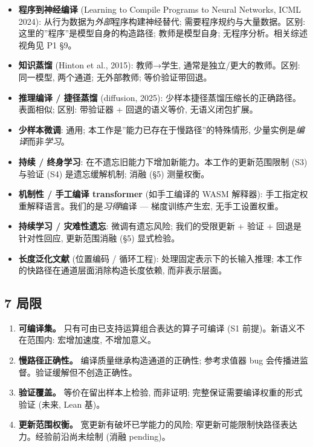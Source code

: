 \documentclass[
]{article}
\providecommand{\tightlist}{%
  \setlength{\itemsep}{0pt}\setlength{\parskip}{0pt}}
\begin{document}
\begin{itemize}
\tightlist
\item
  \textbf{程序到神经编译} (Learning to Compile Programs to Neural
  Networks, ICML 2024): 从行为数据为\emph{外部}程序构建神经替代;
  需要程序规约与大量数据。区别: 这里的''程序''是模型自身的构造路径;
  教师是模型自身; 无程序分析。相关综述视角见 P1 §9。
\item
  \textbf{知识蒸馏} (Hinton et al., 2015): 教师→学生,
  通常是独立/更大的教师。区别: 同一模型, 两个通道; 无外部教师;
  等价验证带回退。
\item
  \textbf{推理编译 / 捷径蒸馏} (diffusion, 2025):
  少样本捷径蒸馏压缩长的正确路径。表面相似; 区别: 带验证器 +
  回退的语义等价, 无语义闭包扩展。
\item
  \textbf{少样本微调}: 通用; 本工作是''能力已存在于慢路径''的特殊情形,
  少量实例是\emph{编译}而非\emph{学习}。
\item
  \textbf{持续 / 终身学习}:
  在不遗忘旧能力下增加新能力。本工作的更新范围限制 (S3) 与验证 (S4)
  是遗忘缓解机制; 消融 (§5) 测量权衡。
\item
  \textbf{机制性 / 手工编译 transformer} (如手工编译的 WASM 解释器):
  手工指定权重解释语言。我们的是\emph{习得}编译 --- 梯度训练产生宏,
  无手工设置权重。
\item
  \textbf{持续学习 / 灾难性遗忘}: 微调有遗忘风险; 我们的受限更新 + 验证
  + 回退是针对性回应, 更新范围消融 (§5) 显式检验。
\item
  \textbf{长度泛化文献} (位置编码 / 循环工程):
  处理固定表示下的长输入推理; 本工作的快路径在通道层面消除构造长度依赖,
  而非表示层面。
\end{itemize}

\subsection{7 局限}\label{ux5c40ux9650}

\begin{enumerate}
\def\labelenumi{\arabic{enumi}.}
\tightlist
\item
  \textbf{可编译集。} 只有可由已支持运算组合表达的算子可编译 (S1
  前提)。新语义不在范围内: 宏增加速度, 不增加意义。
\item
  \textbf{慢路径正确性。} 编译质量继承构造通道的正确性; 参考求值器 bug
  会传播进监督。验证缓解但不创造正确性。
\item
  \textbf{验证覆盖。} 等价在留出样本上检验, 而非证明;
  完整保证需要编译权重的形式验证 (未来, Lean 基)。
\item
  \textbf{更新范围权衡。} 宽更新有破坏已学能力的风险;
  窄更新可能限制快路径表达力。经验前沿尚未绘制 (消融 pending)。
\end{enumerate}
\end{document}
